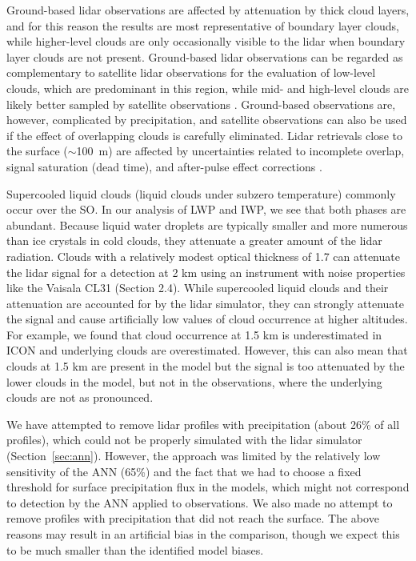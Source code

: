 \documentclass[draft]{agujournal2019}
\begin{document}
Ground-based lidar observations are affected by attenuation by thick cloud layers, and for this reason the results are most representative of boundary layer clouds, while higher-level clouds are only occasionally visible to the lidar when boundary layer clouds are not present. Ground-based lidar observations can be regarded as complementary to satellite lidar observations for the evaluation of low-level clouds, which are predominant in this region, while mid- and high-level clouds are likely better sampled by satellite observations \cite{mcerlich2021}. Ground-based observations are, however, complicated by precipitation, and satellite observations can also be used if the effect of overlapping clouds is carefully eliminated. Lidar retrievals close to the surface ($\sim$100~m) are affected by uncertainties related to incomplete overlap, signal saturation (dead time), and after-pulse effect corrections \cite{kuma2021}.

Supercooled liquid clouds (liquid clouds under subzero temperature) commonly occur over the SO. In our analysis of LWP and IWP, we see that both phases are abundant. Because liquid water droplets are typically smaller and more numerous than ice crystals in cold clouds, they attenuate a greater amount of the lidar radiation. Clouds with a relatively modest optical thickness of 1.7 can attenuate the lidar signal for a detection at 2 km using an instrument with noise properties like the Vaisala CL31 (Section 2.4). While supercooled liquid clouds and their attenuation are accounted for by the lidar simulator, they can strongly attenuate the signal and cause artificially low values of cloud occurrence at higher altitudes. For example, we found that cloud occurrence at 1.5 km is underestimated in ICON and underlying clouds are overestimated. However, this can also mean that clouds at 1.5 km are present in the model but the signal is too attenuated by the lower clouds in the model, but not in the observations, where the underlying clouds are not as pronounced.

We have attempted to remove lidar profiles with precipitation (about 26\% of all profiles), which could not be properly simulated with the lidar simulator (Section~\ref{sec:ann}). However, the approach was limited by the relatively low sensitivity of the ANN (65\%) and the fact that we had to choose a fixed threshold for surface precipitation flux in the models, which might not correspond to detection by the ANN applied to observations. We also made no attempt to remove profiles with precipitation that did not reach the surface. The above reasons may result in an artificial bias in the comparison, though we expect this to be much smaller than the identified model biases.
\end{document}
